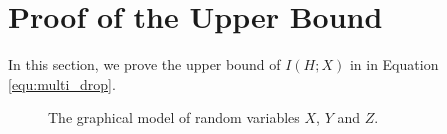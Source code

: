 \section{Proof of the Upper Bound}
\label{app:proof1}
In this section, we prove the upper bound of $I(H; X)$ in \multiheadname{} in Equation \ref{equ:multi_drop}.{}

\begin{figure}[H]
    \centering

    \caption{The graphical model of random variables $X$, $Y$ and $Z$.}
    \label{fig:graphical}
\end{figure}

